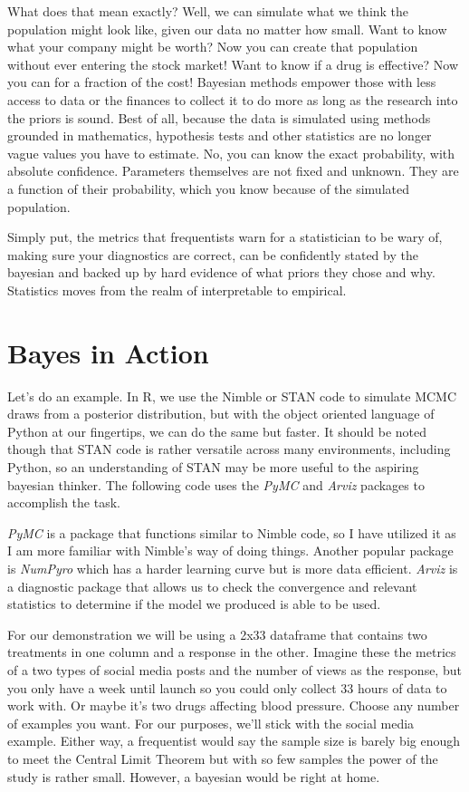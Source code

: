 \documentclass[
  letterpaper,
  DIV=11,
  numbers=noendperiod]{scrartcl}
\begin{document}
What does that mean exactly? Well, we can simulate what we think the
population might look like, given our data no matter how small. Want to
know what your company might be worth? Now you can create that
population without ever entering the stock market! Want to know if a
drug is effective? Now you can for a fraction of the cost! Bayesian
methods empower those with less access to data or the finances to
collect it to do more as long as the research into the priors is sound.
Best of all, because the data is simulated using methods grounded in
mathematics, hypothesis tests and other statistics are no longer vague
values you have to estimate. No, you can know the exact probability,
with absolute confidence. Parameters themselves are not fixed and
unknown. They are a function of their probability, which you know
because of the simulated population.

Simply put, the metrics that frequentists warn for a statistician to be
wary of, making sure your diagnostics are correct, can be confidently
stated by the bayesian and backed up by hard evidence of what priors
they chose and why. Statistics moves from the realm of interpretable to
empirical.

\section{Bayes in Action}\label{bayes-in-action}

Let's do an example. In R, we use the Nimble or STAN code to simulate
MCMC draws from a posterior distribution, but with the object oriented
language of Python at our fingertips, we can do the same but faster. It
should be noted though that STAN code is rather versatile across many
environments, including Python, so an understanding of STAN may be more
useful to the aspiring bayesian thinker. The following code uses the
\emph{PyMC} and \emph{Arviz} packages to accomplish the task.

\emph{PyMC} is a package that functions similar to Nimble code, so I
have utilized it as I am more familiar with Nimble's way of doing
things. Another popular package is \emph{NumPyro} which has a harder
learning curve but is more data efficient. \emph{Arviz} is a diagnostic
package that allows us to check the convergence and relevant statistics
to determine if the model we produced is able to be used.

For our demonstration we will be using a 2x33 dataframe that contains
two treatments in one column and a response in the other. Imagine these
the metrics of a two types of social media posts and the number of views
as the response, but you only have a week until launch so you could only
collect 33 hours of data to work with. Or maybe it's two drugs affecting
blood pressure. Choose any number of examples you want. For our
purposes, we'll stick with the social media example. Either way, a
frequentist would say the sample size is barely big enough to meet the
Central Limit Theorem but with so few samples the power of the study is
rather small. However, a bayesian would be right at home.
\end{document}
